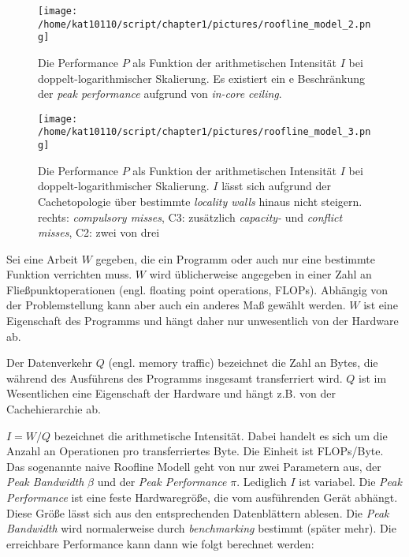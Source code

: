 		\begin{figure}[t]
			\centering
	    	\texttt{[image: /home/kat10110/script/chapter1/pictures/roofline\_model\_2.png]}
    		\caption[Roofline Modell - \textit{in-core ceiling}]{Die Performance $P$ als Funktion der arithmetischen Intensität $I$ bei doppelt-logarithmischer Skalierung. Es existiert ein e Beschränkung der \textit{peak performance} aufgrund von \textit{in-core ceiling}. \autocite{wikiRLM}}
    		\label{1:rl2}
		\end{figure}

		\begin{figure}[b]
			\centering
    		\texttt{[image: /home/kat10110/script/chapter1/pictures/roofline\_model\_3.png]}
	    	\caption[Roofline Modell - \textit{locality walls}]{Die Performance $P$ als Funktion der arithmetischen Intensität $I$ bei doppelt-logarithmischer Skalierung. $I$ lässt sich aufgrund der Cachetopologie über bestimmte \textit{locality walls} hinaus nicht steigern. rechts: \textit{compulsory misses}, C3: zusätzlich \textit{capacity-} und \textit{conflict misses}, C2: zwei von drei \autocite{wikiRLM}}
    		\label{1:rl3}
		\end{figure}
		
		Sei eine \Gls{Arbeit} $W$ gegeben, die ein Programm oder auch nur eine bestimmte Funktion verrichten muss. $W$ wird üblicherweise angegeben in einer Zahl an Fließpunktoperationen (engl. floating point operations, FLOPs). Abhängig von der Problemstellung kann aber auch ein anderes Maß gewählt werden. $W$ ist eine Eigenschaft des Programms und hängt daher nur unwesentlich von der Hardware ab.
		
		Der \Gls{Datenverkehr} $Q$ (engl. memory traffic) bezeichnet die Zahl an Bytes, die während des Ausführens des Programms insgesamt transferriert wird. $Q$ ist im Wesentlichen eine Eigenschaft der Hardware und hängt z.B. von der Cachehierarchie ab.

		$I = W/Q$ bezeichnet die \gls{arithmetische Intensität}. Dabei handelt es sich um die Anzahl an Operationen pro transferriertes Byte. Die Einheit ist FLOPs/Byte.
		Das sogenannte naive Roofline Modell geht von nur zwei Parametern aus, der \textit{\Gls{Peak Bandwidth}} $\beta$ und der \textit{\Gls{Peak Performance}} $\pi$. Lediglich $I$ ist variabel. Die \textit{\Gls{Peak Performance}} ist eine feste Hardwaregröße, die vom ausführenden Gerät abhängt. Diese Größe lässt sich aus den entsprechenden Datenblättern ablesen. Die \textit{\Gls{Peak Bandwidth}} wird normalerweise durch \textit{benchmarking} bestimmt (später mehr). Die erreichbare \Gls{Performance} kann dann wie folgt berechnet werden:
		
